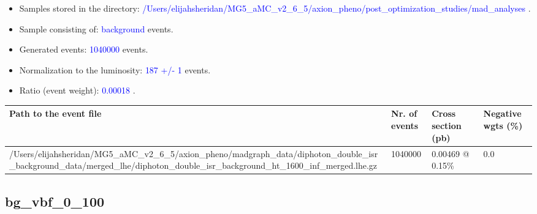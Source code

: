 \documentclass[a4paper, 10pt]{article}
\begin{document}
\begin{itemize}
  \item Samples stored in the directory: \textcolor{blue}{/\-Users/\-elijahsheridan/\-MG5\_aMC\_v2\_6\_5/\-axion\_pheno/\-post\_optimization\_studies/\-mad\_analyses} .
   \item Sample consisting of: \textcolor{blue}{background}  events.
   \item Generated events: \textcolor{blue}{1040000 }  events.
   \item Normalization to the luminosity: \textcolor{blue}{187}\textcolor{blue}{ +/\-- }\textcolor{blue}{1 }  events.
   \item Ratio (event weight): \textcolor{blue}{0.00018 } .  
 
\end{itemize}
\begin{table}[H]
  \begin{center}
    \begin{tabular}{|m{55.0mm}|m{25.0mm}|m{30.0mm}|m{30.0mm}|}
      \hline
      {\cellcolor{yellow}         Path to the event file}& {\cellcolor{yellow}         Nr. of events}& {\cellcolor{yellow}         Cross section (pb)}& {\cellcolor{yellow}         Negative wgts (\%)}\\
      \hline
      {\cellcolor{white}          /\-Users/\-elijahsheridan/\-MG5\_aMC\_v2\_6\_5/\-axion\_pheno/\-madgraph\_data/\-diphoton\_double\_isr\_background\_data/\-merged\_lhe/\-diphoton\_double\_isr\_background\_ht\_1600\_inf\_merged.lhe.gz}& {\cellcolor{white}          1040000}& {\cellcolor{white}          0.00469 @ 0.15\%}& {\cellcolor{white}          0.0}\\
\hline
    \end{tabular}
  \end{center}
\end{table}

\subsection{ bg\_vbf\_0\_100}
\end{document}
